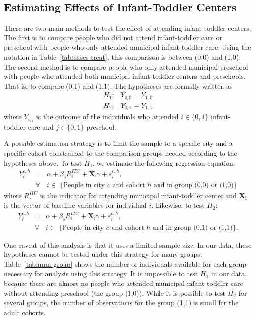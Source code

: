 \subsection{Estimating Effects of Infant-Toddler Centers}
There are two main methods to test the effect of attending infant-toddler centers. The first is to compare people who did not attend infant-toddler care or preschool with people who only attended municipal infant-toddler care. Using the notation in Table~\ref{tab:cases-treat}, this comparison is between (0,0) and (1,0). The second method is to compare people who only attended municipal preschool with people who attended both municipal infant-toddler centers and preschools. That is, to compare (0,1) and (1,1). The hypotheses are formally written as
\begin{eqnarray}
H_1: &  Y_{0,0} = Y_{1,0} \\ 
H_2: &  Y_{0,1} = Y_{1,1} 
\end{eqnarray}
\noindent where $Y_{i,j}$ is the outcome of the individuals who attended $i \in \{0,1\}$ infant-toddler care and $j \in \{0,1\}$ preschool.

A possible estimation strategy is to limit the sample to a specific city and a specific cohort constrained to the comparison groups needed according to the hypotheses above. To test $H_1$, we estimate the following regression equation:
\begin{eqnarray}
Y_{i}^{c,h} & = & \alpha + \beta_{0}R_i^{ITC} + \mathbf{X}_i\gamma + \varepsilon_{i}^{c,h}, \\ \nonumber
& \forall & i \in \text{ \{People in city $c$ and cohort $h$ and in group (0,0) or (1,0)\}}
\end{eqnarray}
where $R_i^{ITC}$ is the indicator for attending municipal infant-toddler center and $\mathbf{X_i}$ is the vector of baseline variables for individual $i$. Likewise, to test $H_2$:
\begin{eqnarray}
Y_{i}^{c,h} & = & \alpha + \beta_{0}R_i^{ITC} + \mathbf{X}_i\gamma + \varepsilon_{i}^{c,h}, \\ \nonumber
& \forall & i \in \text{ \{People in city $c$ and cohort $h$ and in group (0,1) or (1,1)\}.}
\end{eqnarray}

One caveat of this analysis is that it uses a limited sample size. In our data, these hypotheses cannot be tested under this strategy for many groups. Table~\ref{tab:num-group} shows the number of individuals available for each group necessary for analysis using this strategy. It is impossible to test $H_1$ in our data, because there are almost no people who attended municipal infant-toddler care without attending preschool (the group (1,0)). While it is possible to test $H_2$ for several groups, the number of observations for the group (1,1) is small for the adult cohorts. 

